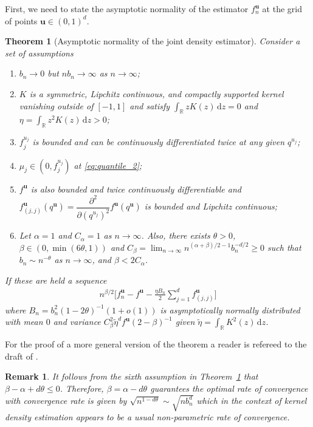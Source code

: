 \documentclass[12pt]{article}
\newtheorem{theorem}{Theorem}
\newtheorem{remark}{Remark}
\begin{document}
	First, we need to state the asymptotic normality of the estimator $ f_n^{\mathbf{u}} $ at the grid of points $ \mathbf{u} \in (0, 1)^d $.
	\begin{theorem}[Asymptotic normality of the joint density estimator] \label{thm:asym_norm_joint}
		Consider a set of assumptions
		\begin{enumerate}
			\item $ b_n \rightarrow 0 $ but $ n b_n \rightarrow \infty $ as $ n\rightarrow\infty $;
			\item $ K $ is a symmetric, Lipchitz continuous, and compactly supported kernel vanishing outside of $ [-1, 1] $ and satisfy $ \int_\mathbb{R} zK(z)\, \text{d}z = 0 $ and $\eta = \int_\mathbb{R} z^2K(z)\, \text{d}z >0 $;
			\item $ f^{u_j}_j $ is bounded and can be continuously differentiated twice at any given $ q^{u_j} $;
			\item $ \mu_j \in (0, f_j^{u_j}) $ at \eqref{eq:quantile_2};
			\item $ f^{\mathbf{u}} $ is also bounded and twice continuously differentiable and $ f^{\mathbf{u}}_{(j, j)}(q^{\mathbf{u}}) = \dfrac{\partial^2}{\partial (q^{u_j})^2} f^{\mathbf{u}}(q^{\mathbf{u}}) $ is bounded and Lipchitz continuous;
			\item Let $ \alpha=1 $ and $ C_\alpha = 1 $ as $ n\rightarrow \infty $. Also, there exists $ \theta > 0 $, $ \beta \in (0, \min(6\theta, 1)) $ and $ C_\beta = \lim_{n\rightarrow\infty}n^{(\alpha+\beta)/2 -1} b_n^{-d/2} \geq 0 $ such that $ b_n \sim n^{-\theta} $ as $ n\rightarrow \infty $, and $ \beta < 2C_\alpha $.
		\end{enumerate}
		
		If these are held a sequence 
		\begin{align}
			n^{\beta/2}\Bigg[f_n^{\mathbf{u}}-f^{\mathbf{u}} - \frac{\eta B_n}{2} \sum_{j=1}^{d}f^{\mathbf{u}}_{(j, j)}\Bigg]
		\end{align}
		where $ B_n = b^2_n(1-2\theta)^{-1}(1+o(1)) $ is asymptotically normally distributed with mean $ 0 $ and variance $ C_\beta^2\widetilde{\eta}^d f^{\mathbf{u}}(2-\beta)^{-1} $ given $ \widetilde{\eta}=\int_\mathbb{R} K^2(z)\, \text{d}z $.
	\end{theorem}
	
	For the proof of a more general version of the theorem a reader is refereed to the draft of \textcite{Camirand}.
	
	\begin{remark}
		It follows from the sixth assumption in Theorem~\ref{thm:asym_norm_joint} that $ \beta-\alpha + d\theta \leq 0 $. Therefore, $ \beta = \alpha-d\theta $ guarantees the optimal rate of convergence with convergence rate is given by $ \sqrt{n^{1-d\theta}} \sim \sqrt{nb_n^d} $ which in the context of kernel density estimation appears to be a usual non-parametric rate of convergence.
	\end{remark}
	
\end{document}
